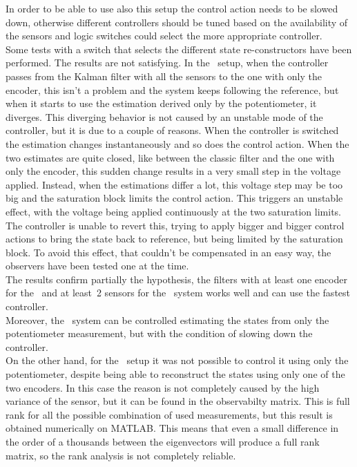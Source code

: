 In order to be able to use also this setup the control action needs to be slowed down, otherwise different controllers should be tuned based on the availability of the sensors and logic switches could select the more appropriate controller.\\

Some tests with a switch that selects the different state re-constructors have been performed. The results are not satisfying. In the \onedof\ setup, when the controller passes from the Kalman filter with all the sensors to the one with only the encoder, this isn't a problem and the system keeps following the reference, but when it starts to use the estimation derived only by the potentiometer, it diverges. This diverging behavior is not caused by an unstable mode of the controller, but it is due to a couple of reasons. When the controller is switched the estimation changes instantaneously and so does the control action. When the two estimates are quite closed, like between the classic filter and the one with only the encoder, this sudden change results in a very small step in the voltage applied. Instead, when the estimations differ a lot, this voltage step may be too big and the saturation block limits the control action. This triggers an unstable effect, with the voltage being applied continuously at the two saturation limits. The controller is unable to revert this, trying to apply bigger and bigger control actions to bring the state back to reference, but being limited by the saturation block. To avoid this effect, that couldn't be compensated in an easy way, the observers have been tested one at the time. \\

The results confirm partially the hypothesis, the filters with at least one encoder for the \onedof\ and at least~2 sensors for the \twodof\ system works well and can use the fastest controller.\\
Moreover, the \onedof\ system can be controlled estimating the states from only the potentiometer measurement, but with the condition of slowing down the controller.\\

On the other hand, for the \twodof\ setup it was not possible to control it using only the potentiometer, despite being able to reconstruct the states using only one of the two encoders.
In this case the reason is not completely caused by the high variance of the sensor, but it can be found in the observabilty matrix. This is full rank for all the possible combination of used measurements, but this result is obtained numerically on MATLAB. This means that even a small difference in the order of a thousands between the eigenvectors will produce a full rank matrix, so the rank analysis is not completely reliable. \\ 


